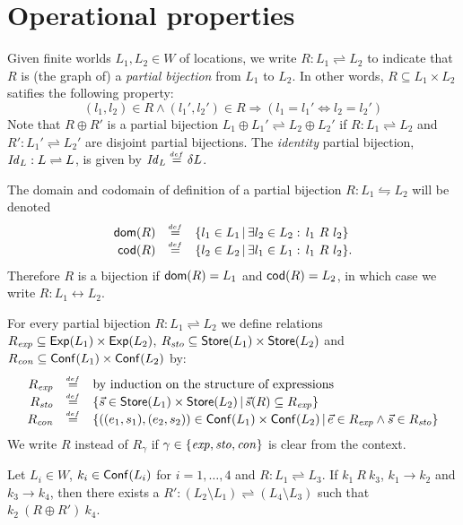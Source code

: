 \documentclass[12pt,a4paper]{article}
\newcommand{\Conf}{\sstyle{Conf}}
\newcommand{\scon}{\nstyle{con}}
\newcommand{\sexp}{\nstyle{exp}}
\newcommand{\ssto}{\nstyle{sto}}
\begin{document}

\section{Operational properties}

Given finite worlds $L_1,L_2 \in W$ of locations, we write $R: L_1 \rightleftharpoons L_2$ to
indicate that $R$ is (the graph of) a {\em partial bijection} from $L_1$ to $L_2$.
In other words, $R \subseteq L_1 \times L_2$ satifies the following property:
\[
(l_1,l_2) \in R \wedge (l_1',l_2')\in R \Rightarrow (l_1=l_1' \Leftrightarrow l_2=l_2')
\]
Note that $R \oplus R'$ is a partial bijection $L_1 \oplus L_1' \rightleftharpoons L_2 \oplus L_2'$
if $R: L_1 \rightleftharpoons L_2$ and $R': L_1' \rightleftharpoons L_2'$ are disjoint partial
bijections. The {\em identity} partial bijection, $\mathit{Id}_L: L \rightleftharpoons L$, is given by
$\mathit{Id}_L \stackrel{_{def}}{=} \delta L$.

The domain and codomain of definition of a partial bijection $R: L_1 \leftrightharpoons L_2$ will
be denoted
\[\begin{array}{rcl}
  \mathsf{dom}(R) &\stackrel{_{def}}{=}& \{ l_1 \in L_1\,|\, \exists l_2\in L_2:\,l_1\ R\ l_2\} \\
  \mathsf{cod}(R) &\stackrel{_{def}}{=}& \{ l_2 \in L_2\,|\, \exists l_1\in L_1:\,l_1\ R\ l_2\} .
\end{array}\]
Therefore $R$ is a bijection if $\mathsf{dom}(R) = L_1$ and $\mathsf{cod}(R) = L_2$, in which case we
write $R: L_1 \leftrightarrow L_2$.

For every partial bijection $R: L_1 \rightleftharpoons L_2$ we define relations
$R_{\sexp} \subseteq \Exp(L_1) \times \Exp(L_2)$, $R_{\ssto} \subseteq \Store(L_1) \times \Store(L_2)$
and $R_{\scon} \subseteq \Conf(L_1) \times \Conf(L_2)$ by:
\[\begin{array}{rcl}
  R_{\sexp} &\defeqn& \text{by induction on the structure of expressions} \\
  R_{\ssto} &\defeqn& \{ \vec{s} \in \Store(L_1) \times \Store(L_2)\,|\,\vec{s}(R) \subseteq R_{\sexp}\} \\
  R_{\scon} &\defeqn& \{((e_1,s_1),(e_2,s_2))\in\Conf(L_1)\times\Conf(L_2)\,|\,\vec{e}\in R_{\sexp}\wedge\vec{s}\in R_{\ssto}\}
\end{array}\]
We write $R$ instead of $R_\gamma$ if $\gamma\in\{\sexp,\ssto,\scon\}$ is clear from the context.

\begin{theorem}
  Let $L_i\in W$, $k_i\in\Conf(L_i)$ for $i=1,\ldots,4$ and  $R: L_1 \rightleftharpoons L_3$. If
  $k_1\ R\ k_3$, $k_1 \to k_2$ and $k_3 \to k_4$, then there exists a
  $R': (L_2 \setminus L_1) \rightleftharpoons (L_4\setminus L_3)$ such that $k_2\ (R \oplus R')\ k_4$.
\end{theorem}
\end{document}
